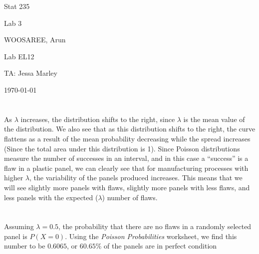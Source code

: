 \documentclass[letterpaper]{article}
\begin{document}
\begin{titlepage}
 \begin{center}
  \vspace*{1cm}
  \Huge
  Stat 235
  \vspace{1cm}
  
  Lab 3
  \vspace{1cm}
  
  WOOSAREE, Arun
  \vspace{1cm}
  
  \Huge
  Lab EL12
  \vspace{1cm}
  
  TA: Jessa Marley
  \vspace{1cm}
  
  \today
  \vfill
 \end{center}
\end{titlepage}

\section{}%
As $\lambda$ increases, the distribution shifts to the right, since $\lambda$ is
the mean value of the distribution. We also see that as this distribution shifts
to the right, the curve flattens as a result of the mean probability decreasing
while the spread increases (Since the total area under this distribution is 1).
Since Poisson distributions measure the number of successes in an interval, and
in this case a ``success'' is a flaw in a plastic panel, we can clearly see that
for manufacturing processes with higher $\lambda$, the variability of the panels
produced increases. This means that we will see slightly more panels with flaws,
slightly more panels with less flaws, and less panels with the expected
($\lambda$) number of flaws.

\section{}%

\subsection{}%
\label{2a}
Assuming $\lambda=0.5$, the probability that there are no flaws in a randomly
selected panel is $P(X=0)$. Using the \textit{Poisson Probabilities} worksheet,
we find this number to be $0.6065$, or $60.65\%$ of the panels are in perfect
condition
\end{document}
